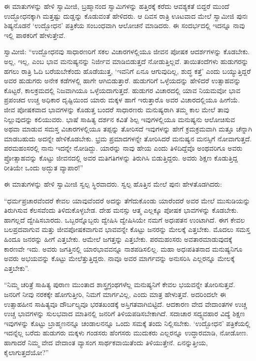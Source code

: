  ಈ ಮಾತುಗಳನ್ನು ಹೇಳಿ ಸ್ವಾಮೀಜಿ, ಬ್ರಹ್ಮಾನಂದ ಸ್ವಾಮಿಗಳನ್ನು ಹತ್ತಿರಕ್ಕೆ ಕರೆದು ಆವಶ್ಯಕತೆ ಬಿದ್ದರೆ ಮುಂದೆ ಉದ್ಭೋಧನಕ್ಕಾಗಿ ಮತ್ತಷ್ಟು ದುಡ್ಡನ್ನು ಕೊಡುವಂತೆ ಹೇಳಿದರು. ಆ ದಿವಸ ರಾತ್ರಿ ಊಟವಾದ ಮೇಲೆ ಸ್ವಾಮೀಜಿ ಪುನಃ ಶಿಷ್ಯನೊಡನೆ ‘ಉದ್ಬೋಧನ’ ಪತ್ರಿಕೆಯ ಸಂಬಂಧವಾಗಿ ಆಲೋಚನೆ ಮಾಡಿದರು. ಈ ಸಂದರ್ಭದಲ್ಲಿ ಇದನ್ನೂ ನಾವು ಇಲ್ಲಿ ಪಾಠಕರಿಗೆ ಹೇಳುತ್ತೇವೆ. 

 ಸ್ವಾಮೀಜಿ: “ಉದ್ಬೋಧನವು ಸಾಧಾರಣರಿಗೆ ಸಕಲ ವಿಚಾರಗಳಲ್ಲಿಯೂ ಜೀವನ ಪೋಷಕ ಆದರ್ಶಗಳನ್ನು ಕೊಡಬೇಕು. ಅಲ್ಲ, ಇಲ್ಲ, ಎಂಬ ಭಾವ ಮನುಷ್ಯನನ್ನು ನಿರ್ಜೀವ ಮಾಡಿಬಿಡುತ್ತದೆ ನೋಡುತ್ತಿಲ್ಲವೆ. ತಾಯಿತಂದೆಗಳು ಹುಡುಗರನ್ನು ಹಗಲು ರಾತ್ರಿ ಓದಿ ಬರೆಯಬೇಕೆಂದು ಹೊಡೆಯುತ್ತ, ‘ಇವನಿಗೆ ಏನೂ ಆಗುವುದಿಲ್ಲ, ಶುದ್ಧ ಕತ್ತೆ’ ಎಂದು ಬಯ್ಯುತ್ತಿದ್ದರೆ ಅವರ ಹುಡುಗರು ಅನೇಕ ಕಡೆಗಳಲ್ಲಿ ಹಾಗೇ ಆಗಿಬಿಡುತ್ತಾರೆ. ಹುಡುಗರಿಗೆ ಒಳ್ಳೆಯದನ್ನು ಹೇಳಿದರೆ ಉತ್ಸಾಹವನ್ನು ಕೊಟ್ಟರೆ, ಕಾಲಕ್ರಮದಲ್ಲಿ ನಿಜವಾಗಿಯೂ ಒಳ್ಳೆಯದಾಗುತ್ತದೆ. ಹುಡುಗರ ವಿಚಾರದಲ್ಲಿ ಯಾವ ನಿಯಮವೋ ಭಾವ ಪ್ರಪಂಚದ ಉಚ್ಚ ಅಧಿಕಾರ ದೃಷ್ಟಿಯಿಂದ ಯಾರು ಮಕ್ಕಳ ಹಾಗೆ ಇರುತ್ತಾರೊ ಅವರ ವಿಚಾರದಲ್ಲಿಯೂ ಹೀಗೆಯೆ. ಜೀವ ಪೋಷಕವಾದ ಭಾವಗಳನ್ನು ಕೊಡುತ್ತ ಬಂದರೆ ಸಾಧಾರಣರು ಮನುಷ್ಯರಾಗಿ ತಮ್ಮ ಕಾಲ ಮೇಲೆ ತಾವು ನಿಲ್ಲುವುದನ್ನು ಕಲಿಯುವರು. ಭಾಷೆ ಸಾಹಿತ್ಯ ದರ್ಶನ ಕವಿತೆ ಶಿಲ್ಪ ಇವುಗಳಲ್ಲಿಯೂ ಮನುಷ್ಯನು ಆಲೋಚಿಸುವ ಅಥವಾ ಮಾಡುವ ಸಮಸ್ತ ವಿಚಾರಗಳಲ್ಲಿಯೂ ತಪ್ಪನ್ನು ತೋರಿಸದೆ ಇವುಗಳನ್ನು ಹೇಗೆ ಕ್ರಮಕ್ರಮವಾಗಿ ಮತ್ತೂ ಚೆನ್ನಾಗಿ ಮಾಡಬಹುದು ಅದನ್ನೇ ಹೇಳಿಕೊಡಬೇಕು. ಭ್ರಮ ಪ್ರಮಾದಗಳನ್ನೇ ತೋರಿಸಿದರೆ ಮನುಷ್ಯನ ಮನಸ್ಸಿಗೆ ನೋವಾಗುತ್ತದೆ. ಪರಮಹಂಸರಲ್ಲಿ ನಾನು ಇದನ್ನೇ ನೋಡಿದ್ದು. ಯಾರನ್ನು ನಾವು ಹೇಯ ಎಂದು ತಿಳಿದಿದ್ದೆವೊ ಅಂಥವರಿಗೂ ಅವರು ಪ್ರೋತ್ಸಾಹವನ್ನು ಕೊಟ್ಟು ಜೀವನದಲ್ಲಿ ಅವರ ಮತಿಗತಿಗಳನ್ನು ತಿರುಗಿಸಿ ಬಿಡುತ್ತಿದ್ದರು. ಅವರು ಶಿಕ್ಷಣ ಕೊಡುತ್ತಿದ್ದ ರೀತಿಯೇ ಒಂದು ಅದ್ಭುತ ವ್ಯಾಪಾರ!” 

 ಈ ಮಾತುಗಳನ್ನು ಹೇಳಿ ಸ್ವಾಮೀಜಿ ಸ್ವಲ್ಪ ಸ್ಥಿರವಾದರು. ಸ್ವಲ್ಪ ಹೊತ್ತಿನ ಮೇಲೆ ಪುನಃ ಹೇಳತೊಡಗಿದರು: 

 “ಧರ್ಮಪ್ರಚಾರವೆಂದರೆ ಕೇವಲ ಯಾವುವೆಂದರೆ ಅದನ್ನು ತೆಗೆದುಕೊಂಡು ಯಾರೆಂದರೆ ಅವರ ಮೇಲೆ ಮುಸುಡಿಯನ್ನು ತಿರುಗಿಸುವ ಕೆಲಸವೆಂದು ತಿಳಿದುಕೊಳ್ಳಬೇಡ. ದೇಹ ಮನಸ್ಸು ಆತ್ಮ ಎಲ್ಲಕ್ಕೂ ಪೋಷಕ ಭಾವಗಳನ್ನು ಕೊಡಬೇಕು. ಹಾಗಲ್ಲದೆ ದ್ವೇಷಿಸಬಾರದು. ಒಬ್ಬರನ್ನೊಬ್ಬರು ದ್ವೇಷಿಸಿ ದ್ವೇಷಿಸಿಯೇ ನಮಗೆ ಅಧಃಪತನ ಉಂಟಾಗಿದೆ. ಈಗ ಕೇವಲ ಬಲಪ್ರದವಾಗುವ ಮತ್ತು ಜೀವಪೋಷಕವಾಗುವ ಭಾವವನ್ನೇ ಕೊಟ್ಟು ಜನರನ್ನು ಮೇಲಕ್ಕೆ ಎತ್ತಬೇಕು. ಮೊದಲು ಸಮಸ್ತ ಹಿಂದೂ ಜನರನ್ನು ಹೀಗೆ ಎತ್ತಬೇಕು. ಆಮೇಲೆ ಜಗತ್ತನ್ನು ಎತ್ತಬೇಕು. ಪರಮಹಂಸರು ಅವತಾರಮಾಡುವುದಕ್ಕೆ ಕಾರಣವೇ ಇದು. ಅವರು ಜಗತ್ತಿನಲ್ಲಿ ಯಾರಭಾವವನ್ನೂ ನಾಶಪಡಿಸಲಿಲ್ಲ. ಮಹಾ ಅಧಃಪತಿತನಾದ ಮನುಷ್ಯನಿಗೂ ಅವರು ಅಭಯವನ್ನು ಕೊಟ್ಟು ಮೇಲೆತ್ತುತ್ತಿದ್ದರು. ನಾವೂ ಅವರ ಮಾರ್ಗವನ್ನು ಅನುಸರಿಸಿ ಎಲ್ಲರನ್ನೂ ಮೇಲಕ್ಕೆ ಎತ್ತಬೇಕು”. 

 “ನಿಮ್ಮ ಚರಿತ್ರೆ ಸಾಹಿತ್ಯ ಪುರಾಣ ಮುಂತಾದ ಶಾಸ್ತ್ರಗ್ರಂಥಗಳೆಲ್ಲ ಮನುಷ್ಯನಿಗೆ ಕೇವಲ ಭಯವನ್ನೇ ತೋರಿಸುತ್ತವೆ. ಜನರಿಗೆ ನೀವು ನರಕಕ್ಕೇ ಹೋಗುತ್ತೀರಿ, ನಿಮಗೆ ಮಾರ್ಗವಿಲ್ಲ, ಎಂದು ಮಾತ್ರ ಹೇಳುತ್ತವೆ. ಅದರಿಂದಲೇ ಈ ಉತ್ಸಾಹಹೀನ ಸಾಹಿತ್ಯವೂ ದೌರ್ಬಲ್ಯವೂ ಭರತಖಂಡಕ್ಕೆ ಅಸ್ತಿಗತವಾಗಿಬಿಟ್ಟಿದೆ. ಆದಕಾರಣ ವೇದ ವೇದಾಂತಗಳ ಉಚ್ಚ ಉಚ್ಚ ಭಾವಗಳನ್ನು ಸುಲಭವಾದ ಮಾತಿನಲ್ಲಿ ಜನರಿಗೆ ತಿಳಿಯಪಡಿಸಬೇಕಾಗಿದೆ. ಸದಾಚಾರ ಸದ್ವ್ಯವಹಾರ ವಿದ್ಯೆ ಶಿಕ್ಷಣ ಇವುಗಳನ್ನು ಕೊಟ್ಟು ಬ್ರಾಹ್ಮಣನನ್ನೂ ಚಂಡಾಲನನ್ನೂ ಒಂದು ಸಮಕ್ಕೆ ತಂದು ನಿಲ್ಲಿಸಬೇಕು. ‘ಉದ್ಬೋಧನ' ಪತ್ರಿಕೆಯಲ್ಲಿ ಇದನ್ನೆಲ್ಲ ಬರೆದು ಹುಡುಗರು ಮಕ್ಕಳು ಗಂಡಸರು ಹೆಂಗಸರು ಮುದುಕರು ಎಲ್ಲರನ್ನೂ ಉದ್ಧಾರಮಾಡಿ, ನೋಡೋಣ. ಹಾಗಾದರೆ ನಿಮ್ಮ ವೇದ ವೇದಾಂತ ವ್ಯಾಸಂಗ ಸಾರ್ಥಕವಾಯಿತೆಂದು ತಿಳಿಯುತ್ತೇನೆ. ಏನನ್ನುತ್ತೀಯ, ಕೈಲಾಗುತ್ತದೆಯೋ?” 

